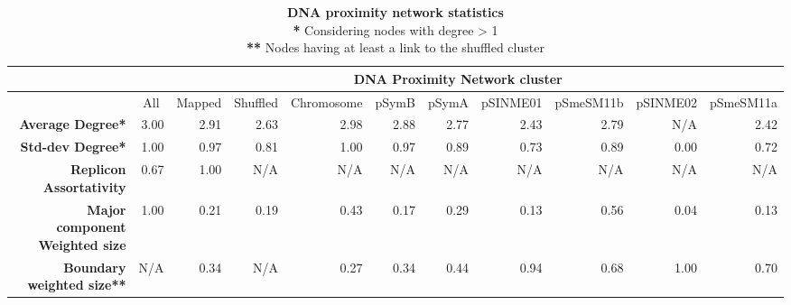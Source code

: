 \begin{table}
  \centering
  \tiny
    \begin{tabular}{rrrrrrrrrrr}
    \toprule
          & \multicolumn{10}{c}{\textbf{DNA Proximity Network cluster}} \\
    \midrule
          & \multicolumn{1}{c}{All} & \multicolumn{1}{c}{Mapped} & \multicolumn{1}{c}{Shuffled} & \multicolumn{1}{c}{Chromosome} & \multicolumn{1}{c}{pSymB} & \multicolumn{1}{c}{pSymA} & \multicolumn{1}{c}{pSINME01} & \multicolumn{1}{c}{pSmeSM11b} & \multicolumn{1}{c}{pSINME02} & \multicolumn{1}{c}{pSmeSM11a} \\
    \textbf{Average Degree*} & 3.00  & 2.91  & 2.63  & 2.98  & 2.88  & 2.77  & 2.43  & 2.79  & N/A   & 2.42 \\
    \textbf{Std-dev Degree*} & 1.00  & 0.97  & 0.81  & 1.00  & 0.97  & 0.89  & 0.73  & 0.89  & 0.00  & 0.72 \\
    \textbf{Replicon Assortativity} & 0.67  & 1.00  & N/A & N/A & N/A & N/A & N/A & N/A & N/A & N/A \\
    \textbf{Major component Weighted size} & 1.00  & 0.21  & 0.19  & 0.43  & 0.17  & 0.29  & 0.13  & 0.56  & 0.04  & 0.13 \\
    \textbf{Boundary weighted size**} & N/A & 0.34  & N/A & 0.27  & 0.34  & 0.44  & 0.94  & 0.68  & 1.00  & 0.70 \\
    \bottomrule
    \end{tabular}%
  \caption{\textbf{DNA proximity network statistics}\\
  \textbf{*} Considering nodes with degree > 1\\
  \textbf{**} Nodes having at least a link to the shuffled cluster}
  \label{tab:proximity}%
\end{table}%

